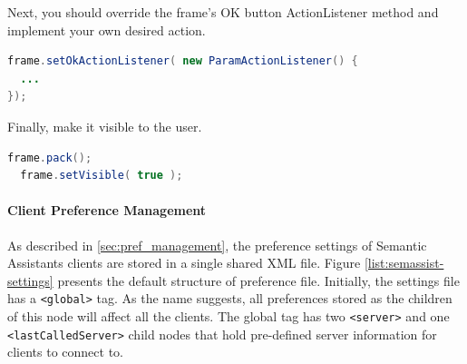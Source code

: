 Next, you should override the frame's OK button ActionListener method and implement your own desired action.

\begin{lstlisting}[language=Java,xleftmargin=4mm,columns=flexible]
frame.setOkActionListener( new ParamActionListener() {
  ...
});
\end{lstlisting}

Finally, make it visible to the user.

\begin{lstlisting}[language=Java,xleftmargin=4mm,columns=flexible]
  frame.pack();
  frame.setVisible( true );
\end{lstlisting}


\paragraph{Client Preference Management}
\label{client_pref}
As described in \ref{sec:pref_management}, the preference settings of Semantic Assistants clients are stored in a single shared XML file. Figure \ref{list:semassist-settings} presents the default structure of preference file. Initially, the settings file has a \texttt{<global>} tag. As the name suggests, all preferences stored as the children of this node will affect all the clients. The global tag has two \texttt{<server>} and one \texttt{<lastCalledServer>} child nodes that hold pre-defined server information for clients to connect to.
 
